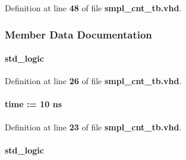 Definition at line {\bf 48} of file {\bf smpl\+\_\+cnt\+\_\+tb.\+vhd}.



\subsubsection{Member Data Documentation}
\paragraph[{clk0}]{ {\bfseries \textcolor{comment}{std\+\_\+logic}\textcolor{vhdlchar}{ }} \hspace{0.3cm}{\ttfamily [Signal]}}\label{classsmpl__cnt__tb_1_1tb__behave_a693d72741b9413130fe2d67511b642be}


Definition at line {\bf 26} of file {\bf smpl\+\_\+cnt\+\_\+tb.\+vhd}.

\paragraph[{clk0\+\_\+period}]{ {\bfseries \textcolor{comment}{time}\textcolor{vhdlchar}{ }\textcolor{vhdlchar}{ }\textcolor{vhdlchar}{\+:}\textcolor{vhdlchar}{=}\textcolor{vhdlchar}{ }\textcolor{vhdlchar}{ }\textcolor{vhdlchar}{ } \textcolor{vhdldigit}{10} \textcolor{vhdlchar}{ }\textcolor{vhdlchar}{ns}\textcolor{vhdlchar}{ }} \hspace{0.3cm}{\ttfamily [Constant]}}\label{classsmpl__cnt__tb_1_1tb__behave_ad03d90619a1930e0f5daa16a616edd90}


Definition at line {\bf 23} of file {\bf smpl\+\_\+cnt\+\_\+tb.\+vhd}.

\paragraph[{clk1}]{ {\bfseries \textcolor{comment}{std\+\_\+logic}\textcolor{vhdlchar}{ }} \hspace{0.3cm}{\ttfamily [Signal]}}\label{classsmpl__cnt__tb_1_1tb__behave_ade95921e47b0e4d2d11e496794648550}


